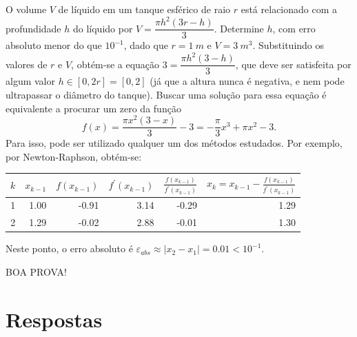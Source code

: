 \documentclass[12pt,a4paper]{article}
\begin{document}
\begin{ExerciseList}
\Exercise[title={2,0}] O volume $V$ de líquido em um tanque esférico de raio $r$ está relacionado com a profundidade $h$ do líquido por $V = \dfrac{\pi h^2(3r-h)}{3}$. Determine $h$, com erro absoluto menor do que $10^{-1}$, dado que $r=1\ m$ e $V = 3\ m^3$.
\Answer Substituindo os valores de $r$ e $V$, obtém-se a equação
$3 = \dfrac{\pi h^2(3-h)}{3}$, que deve ser satisfeita por algum valor $h \in [0, 2r] = [0, 2]$ (já que a altura nunca é negativa, e nem pode ultrapassar o diâmetro do tanque). Buscar uma solução para essa equação é equivalente a procurar um zero da função
\[
f(x)
= \dfrac{\pi x^2(3-x)}{3} - 3
= -\dfrac{\pi}{3}x^3 + \pi x^2 - 3.
\]
Para isso, pode ser utilizado qualquer um dos métodos estudados. Por exemplo, por Newton-Raphson, obtém-se:
\begin{center}
\begin{tabular}{|r|r|r|r|r|r|}
\hline
$k$ &  $x_{k-1}$ & $f(x_{k-1})$ & $f^\prime(x_{k-1})$ & $\frac{f(x_{k-1})}{f^\prime(x_{k-1})}$ & $x_k = x_{k-1} - \frac{f(x_{k-1})}{f^\prime(x_{k-1})}$ \\
\hline
1 & 1.00 & -0.91 & 3.14 & -0.29 & 1.29 \\
\hline
2 & 1.29 & -0.02 & 2.88 & -0.01 & 1.30 \\
\hline
\end{tabular}
\end{center}
Neste ponto, o erro absoluto é $\varepsilon_{abs} \approx |x_2 - x_1| = 0.01 < 10^{-1}$.

\end{ExerciseList}

\vspace{0.5cm}
\begin{center}
BOA PROVA!
\end{center}

\newpage
\restoregeometry
\section*{Respostas}
\shipoutAnswer
\end{document}
